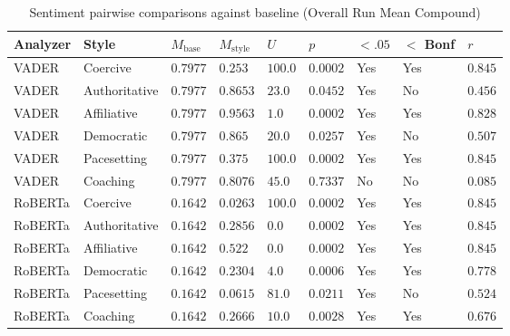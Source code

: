 \begin{table}[htbp]
  \centering
  \small
  \setlength{\tabcolsep}{2pt}
  \caption{Sentiment pairwise comparisons against baseline (Overall Run Mean Compound)}
  \label{tab:03-sentiment-pairwise-overall-run-mean-compound}
\begin{tabular}{>{\raggedright\arraybackslash}p{2.4cm}>{\raggedright\arraybackslash}p{2.0cm}>{\raggedleft\arraybackslash}p{1.6cm}>{\raggedleft\arraybackslash}p{1.6cm}>{\raggedleft\arraybackslash}p{1.3cm}>{\raggedleft\arraybackslash}p{1.8cm}>{\centering\arraybackslash}p{1.2cm}>{\centering\arraybackslash}p{1.5cm}>{\raggedleft\arraybackslash}p{1.2cm}}
    \toprule
    Analyzer & Style & $M_{\text{base}}$ & $M_{\text{style}}$ & $U$ & $p$ & $<.05$ & $<$ Bonf & $r$ \\
    \midrule
    VADER & Coercive & $0.7977$ & $0.253$ & $100.0$ & $0.0002$ & Yes & Yes & $0.845$ \\
    VADER & Authoritative & $0.7977$ & $0.8653$ & $23.0$ & $0.0452$ & Yes & No & $0.456$ \\
    VADER & Affiliative & $0.7977$ & $0.9563$ & $1.0$ & $0.0002$ & Yes & Yes & $0.828$ \\
    VADER & Democratic & $0.7977$ & $0.865$ & $20.0$ & $0.0257$ & Yes & No & $0.507$ \\
    VADER & Pacesetting & $0.7977$ & $0.375$ & $100.0$ & $0.0002$ & Yes & Yes & $0.845$ \\
    VADER & Coaching & $0.7977$ & $0.8076$ & $45.0$ & $0.7337$ & No & No & $0.085$ \\
    RoBERTa & Coercive & $0.1642$ & $0.0263$ & $100.0$ & $0.0002$ & Yes & Yes & $0.845$ \\
    RoBERTa & Authoritative & $0.1642$ & $0.2856$ & $0.0$ & $0.0002$ & Yes & Yes & $0.845$ \\
    RoBERTa & Affiliative & $0.1642$ & $0.522$ & $0.0$ & $0.0002$ & Yes & Yes & $0.845$ \\
    RoBERTa & Democratic & $0.1642$ & $0.2304$ & $4.0$ & $0.0006$ & Yes & Yes & $0.778$ \\
    RoBERTa & Pacesetting & $0.1642$ & $0.0615$ & $81.0$ & $0.0211$ & Yes & No & $0.524$ \\
    RoBERTa & Coaching & $0.1642$ & $0.2666$ & $10.0$ & $0.0028$ & Yes & Yes & $0.676$ \\
    \bottomrule
\end{tabular}%
\end{table}

